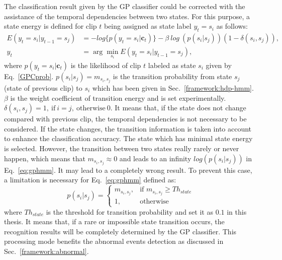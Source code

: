 The classification result given by the GP classifier could be corrected with the assistance of the temporal dependencies between two states. 
For this purpose, a state energy is defined for clip $t$ being assigned as state label $y_t=s_i$ as follows:
\begin{align}
	E(y_t=s_i|y_{t-1}=s_j) &= -log\{p(y_t=s_i|\mathbf{c}_t)\}-\beta~log~(p(s_i|s_j)) (1-\delta(s_i,s_j)),\\\label{eq:gphmm}
	y_t &= \arg\min_{s_i}E(y_t=s_i|y_{t-1}=s_j),
\end{align}
where $p(y_t=s_i|\mathbf{c}_t)$ is the likelihood of clip $t$ labeled as state $s_i$ given by Eq.~\eqref{GPCprob}. $p(s_i|s_j) = m_{s_i,s_j}$ is the transition probability from state $s_j$ (state of previous clip) to $s_i$ which has been given in Sec.~\ref{framework:hdp-hmm}. $\beta$ is the weight coefficient of transition energy and is set experimentally. $\delta(s_i,s_j)=1,~\mbox{if}~i=j,~\mbox{otherwise}~0$. 
It means that, if the state does not change compared with previous clip, the temporal dependencies is not necessary to be considered. If the state changes, the transition information is taken into account to enhance the classification accuracy. The state which has minimal state energy is selected. 
However, the transition between two states really rarely or never happen, which means that $m_{s_i,s_j}\approx 0$ and leads to an infinity $log(p(s_i|s_j))$ in Eq.~\eqref{eq:gphmm}. It may lead to a completely wrong result.
To prevent this case, a limitation is necessary for Eq.~\eqref{eq:gphmm} defined as:
\begin{equation}
	p(s_i|s_j)=
	\begin{cases}
		m_{s_i,s_j},  & \mbox{if~} m_{s_i,s_j}\geq Th_{state}\\
		1, & \mbox{otherwise}
	\end{cases}
\end{equation}
where $Th_{state}$ is the threshold for transition probability and set it as $0.1$ in this thesis.
It means that, if a rare or impossible state transition occurs, the recognition results will be completely determined by the GP classifier. This processing mode benefits the abnormal events detection as discussed in Sec.~\ref{framework:abnormal}.

